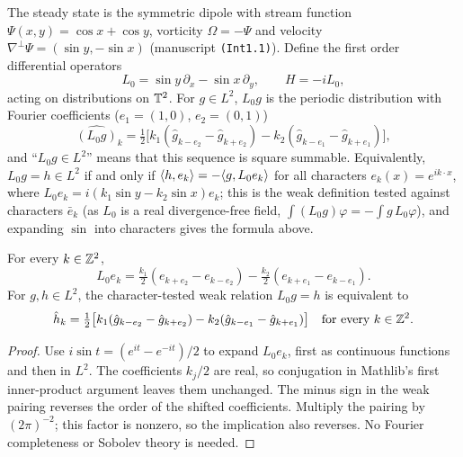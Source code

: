\begin{definition}
\label{def:dipole}
\leanok
The steady state is the symmetric dipole with stream function
$\Psi(x,y)=\cos x+\cos y$, vorticity $\Omega=-\Psi$ and velocity
$\nabla^\perp\Psi=(\sin y,-\sin x)$ (manuscript \texttt{(Int1.1)}). Define the
first order differential operators
\[
  L_0=\sin y\,\partial_x-\sin x\,\partial_y,\qquad H=-iL_0,
\]
acting on distributions on $\mathbb{T}^2$. For $g\in L^2$, $L_0g$ is the periodic
distribution with Fourier coefficients ($e_1=(1,0)$, $e_2=(0,1)$)
\[
  \widehat{(L_0g)}_k=\tfrac12\big[k_1(\hat g_{k-e_2}-\hat g_{k+e_2})
                         -k_2(\hat g_{k-e_1}-\hat g_{k+e_1})\big],
\]
and ``$L_0g\in L^2$'' means that this sequence is square summable.
Equivalently, $L_0g=h\in L^2$ if and only if
$\langle h,e_k\rangle=-\langle g,L_0e_k\rangle$ for all characters
$e_k(x)=e^{ik\cdot x}$, where
$L_0e_k=i(k_1\sin y-k_2\sin x)e_k$; this is the weak definition tested against
characters $\bar e_k$ (as $L_0$ is a real divergence-free field,
$\int(L_0g)\varphi=-\int g\,L_0\varphi$), and expanding $\sin$ into
characters gives the formula above.
\end{definition}

\begin{lemma}
\label{lem:transport-fourier}
\leanok
For every $k\in\mathbb{Z}^2$,
\[
 L_0e_k=\tfrac{k_1}{2}(e_{k+e_2}-e_{k-e_2})
          -\tfrac{k_2}{2}(e_{k+e_1}-e_{k-e_1}).
\]
For $g,h\in L^2$, the character-tested weak relation $L_0g=h$ is equivalent to
\[
 \hat h_k=\tfrac12\big[k_1(\hat g_{k-e_2}-\hat g_{k+e_2})
                    -k_2(\hat g_{k-e_1}-\hat g_{k+e_1})\big]
 \quad\text{for every }k\in\mathbb{Z}^2.
\]
\end{lemma}

\begin{proof}
\leanok
Use $i\sin t=(e^{it}-e^{-it})/2$ to expand $L_0e_k$, first as continuous
functions and then in $L^2$. The coefficients $k_j/2$ are real, so conjugation
in Mathlib's first inner-product argument leaves them unchanged. The minus
sign in the weak pairing reverses the order of the shifted coefficients.
Multiply the pairing by $(2\pi)^{-2}$; this factor is nonzero, so the
implication also reverses. No Fourier completeness or Sobolev theory is needed.
\end{proof}

